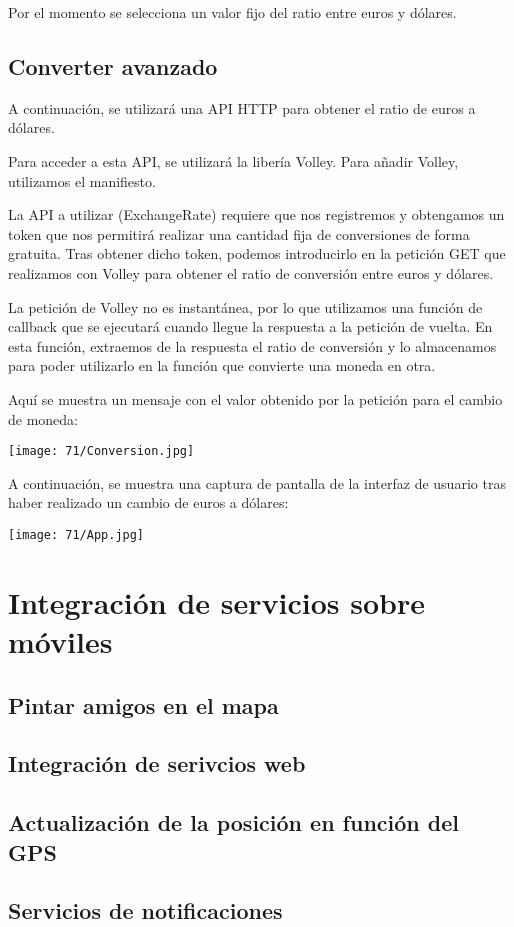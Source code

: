 Por el momento se selecciona un valor fijo del ratio entre euros y dólares.

\subsection{Converter avanzado}

A continuación, se utilizará una API HTTP para obtener el ratio de euros a dólares.

Para acceder a esta API, se utilizará la libería Volley.
Para añadir Volley, utilizamos el manifiesto.

La API a utilizar (ExchangeRate) requiere que nos registremos y obtengamos un token
que nos permitirá realizar una cantidad fija de conversiones de forma gratuita.
Tras obtener dicho token, podemos introducirlo en la petición GET que realizamos con
Volley para obtener el ratio de conversión entre euros y dólares.

La petición de Volley no es instantánea, por lo que utilizamos una función de callback
que se ejecutará cuando llegue la respuesta a la petición de vuelta.
En esta función, extraemos de la respuesta el ratio de conversión y lo almacenamos
para poder utilizarlo en la función que convierte una moneda en otra.

Aquí se muestra un mensaje con el valor obtenido por la petición para el cambio de moneda:

\begin{minipage}{\linewidth}
	\centering
	\texttt{[image: 71/Conversion.jpg]}
	\label{fig:71/1}
\end{minipage}

A continuación, se muestra una captura de pantalla de la interfaz de usuario tras
haber realizado un cambio de euros a dólares:

\begin{minipage}{\linewidth}
	\centering
	\texttt{[image: 71/App.jpg]}
	\label{fig:71/1}
\end{minipage}

\section{Integración de servicios sobre móviles}

\subsection{Pintar amigos en el mapa}

\subsection{Integración de serivcios web}

\subsection{Actualización de la posición en función del GPS}

\subsection{Servicios de notificaciones}
